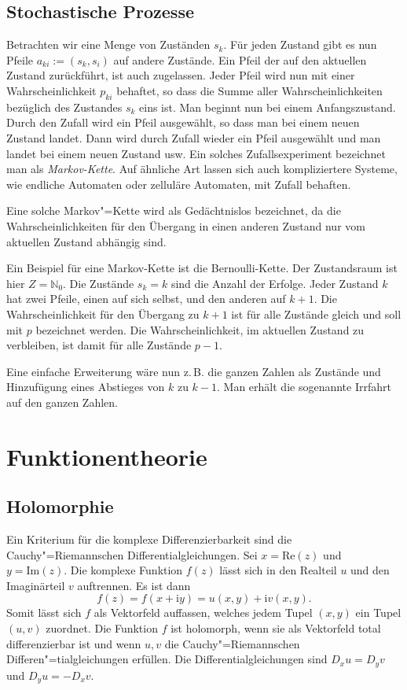 \documentclass[a4paper,11pt,fleqn,twocolumn,twoside]{scrartcl}
\numberwithin{equation}{section}
\newcommand{\ui}{\mathrm i}
\begin{document}
\subsection{Stochastische Prozesse}
Betrachten wir eine Menge von Zuständen $s_k$. Für jeden
Zustand gibt es nun Pfeile $a_{ki}:=(s_k,s_i)$ auf andere Zustände.
Ein Pfeil der auf den aktuellen Zustand zurückführt, ist auch
zugelassen. Jeder Pfeil wird nun mit einer Wahrscheinlichkeit
$p_{ki}$ behaftet, so dass die Summe aller Wahrscheinlichkeiten
bezüglich des Zustandes $s_k$ eins ist. Man beginnt nun bei einem
Anfangszustand. Durch den Zufall wird ein Pfeil ausgewählt, so dass
man bei einem neuen Zustand landet. Dann wird durch Zufall wieder
ein Pfeil ausgewählt und man landet bei einem neuen Zustand usw.
Ein solches Zufallsexperiment bezeichnet man als
\textit{Markov-Kette}. Auf ähnliche Art lassen sich auch
kompliziertere Systeme, wie endliche Automaten oder zelluläre
Automaten, mit Zufall behaften.

Eine solche Markov"=Kette wird als Gedächtnislos bezeichnet, da
die Wahrscheinlichkeiten für den Übergang in einen anderen Zustand
nur vom aktuellen Zustand abhängig sind.

Ein Beispiel für eine Markov-Kette ist die Bernoulli-Kette.
Der Zustandsraum ist hier $Z=\mathbb{N}_0$. Die Zustände $s_k=k$
sind die Anzahl der Erfolge. Jeder Zustand $k$ hat zwei Pfeile,
einen auf sich selbst, und den anderen auf $k+1$. Die
Wahrscheinlichkeit für den Übergang zu $k+1$ ist für alle Zustände
gleich und soll mit $p$ bezeichnet werden. Die Wahrscheinlichkeit,
im aktuellen Zustand zu verbleiben, ist damit für alle
Zustände $p-1$.

Eine einfache Erweiterung wäre nun z.\,B. die ganzen Zahlen als
Zustände und Hinzufügung eines Abstieges von $k$ zu $k-1$.
Man erhält die sogenannte Irrfahrt auf den ganzen Zahlen.


\newpage
\section{Funktionentheorie}
\subsection{Holomorphie}

Ein Kriterium für die komplexe Differenzierbarkeit sind die
Cauchy"=Riemannschen Differentialgleichungen. Sei $x=\mathrm{Re}(z)$
und $y=\mathrm{Im}(z)$. Die komplexe Funktion $f(z)$ lässt sich
in den Realteil $u$ und den Imaginärteil $v$ auftrennen. Es ist
dann
\begin{equation}
f(z) = f(x+\ui y) = u(x,y)+\ui v(x,y).
\end{equation}
Somit lässt sich $f$ als Vektorfeld auffassen, welches jedem Tupel
$(x,y)$ ein Tupel $(u,v)$ zuordnet. Die Funktion $f$ ist
holomorph, wenn sie als Vektorfeld total differenzierbar ist und
wenn $u,v$ die Cauchy"=Riemannschen Differen"=tialgleichungen
erfüllen. Die Differentialgleichungen sind $D_x u=D_y v$ und
$D_y u = -D_x v$.
\end{document}
